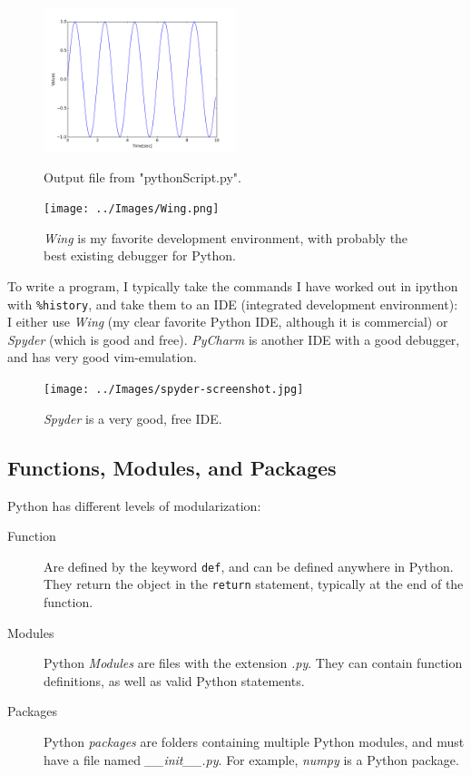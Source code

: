 \begin{figure}
  \centering
  \includegraphics[width=0.5\textwidth]{../Images/Sinewave.png}\\
  \caption{Output file from "pythonScript.py".}
  \label{fig:pythonScript}
\end{figure}


\begin{figure}
  \centering
  \texttt{[image: ../Images/Wing.png]}\\
  \caption{\emph{Wing} is my favorite development environment, with probably the best existing debugger for Python.}
\end{figure}

To write a program, I typically take the commands I have worked out in ipython with \lstinline{%history}, and take them to an IDE (integrated development environment): I either use \emph{Wing} (my clear favorite Python IDE, although it is commercial) or \emph{Spyder} (which is good and free). \emph{PyCharm} is another IDE with a good debugger, and has very good vim-emulation.

\begin{figure}
  \centering
  \texttt{[image: ../Images/spyder-screenshot.jpg]}\\
  \caption{\emph{Spyder} is a very good, free IDE.}
\end{figure}

\subsection{Functions, Modules, and Packages}

Python has different levels of modularization:

\begin{description}
  \item[Function] Are defined by the keyword \lstinline{def}, and can be defined anywhere in Python. They return the object in the \lstinline{return} statement, typically at the end of the function.
  \item[Modules] Python \emph{Modules} are files with the extension \emph{.py}. They can contain function definitions, as well as valid Python statements.
  \item[Packages] Python \emph{packages} are folders containing multiple Python modules, and must have a file named \emph{\_\_init\_\_.py}. For example, \emph{numpy} is a Python package.
\end{description}

